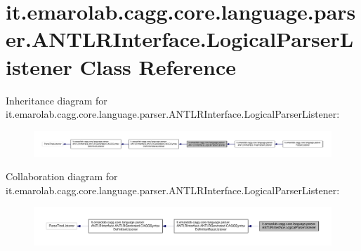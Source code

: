 \hypertarget{classit_1_1emarolab_1_1cagg_1_1core_1_1language_1_1parser_1_1ANTLRInterface_1_1LogicalParserListener}{\section{it.\-emarolab.\-cagg.\-core.\-language.\-parser.\-A\-N\-T\-L\-R\-Interface.\-Logical\-Parser\-Listener Class Reference}
\label{classit_1_1emarolab_1_1cagg_1_1core_1_1language_1_1parser_1_1ANTLRInterface_1_1LogicalParserListener}
}


Inheritance diagram for it.\-emarolab.\-cagg.\-core.\-language.\-parser.\-A\-N\-T\-L\-R\-Interface.\-Logical\-Parser\-Listener\-:\nopagebreak
\begin{figure}[H]
\begin{center}
\leavevmode
\includegraphics[width=350pt]{classit_1_1emarolab_1_1cagg_1_1core_1_1language_1_1parser_1_1ANTLRInterface_1_1LogicalParserListener__inherit__graph}
\end{center}
\end{figure}


Collaboration diagram for it.\-emarolab.\-cagg.\-core.\-language.\-parser.\-A\-N\-T\-L\-R\-Interface.\-Logical\-Parser\-Listener\-:\nopagebreak
\begin{figure}[H]
\begin{center}
\leavevmode
\includegraphics[width=350pt]{classit_1_1emarolab_1_1cagg_1_1core_1_1language_1_1parser_1_1ANTLRInterface_1_1LogicalParserListener__coll__graph}
\end{center}
\end{figure}
